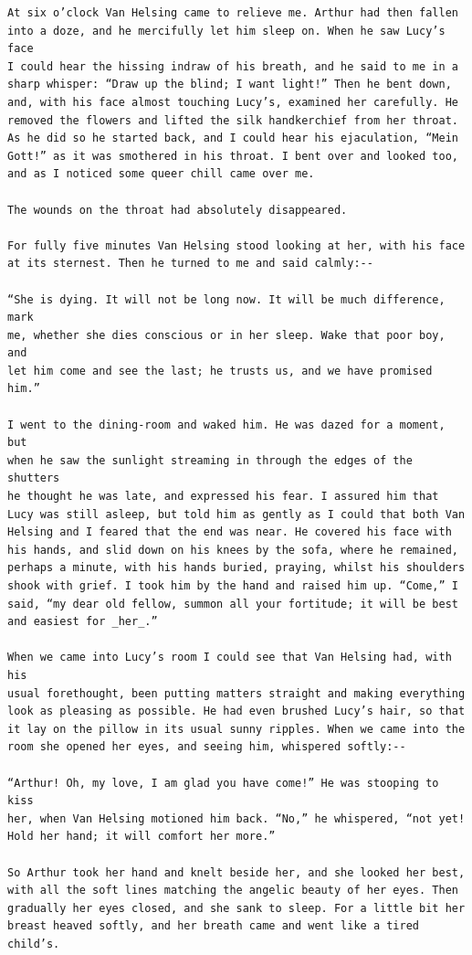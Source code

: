 \documentclass{article}
\begin{document}
\begin{verbatim}
At six o’clock Van Helsing came to relieve me. Arthur had then fallen
into a doze, and he mercifully let him sleep on. When he saw Lucy’s face
I could hear the hissing indraw of his breath, and he said to me in a
sharp whisper: “Draw up the blind; I want light!” Then he bent down,
and, with his face almost touching Lucy’s, examined her carefully. He
removed the flowers and lifted the silk handkerchief from her throat.
As he did so he started back, and I could hear his ejaculation, “Mein
Gott!” as it was smothered in his throat. I bent over and looked too,
and as I noticed some queer chill came over me.

The wounds on the throat had absolutely disappeared.

For fully five minutes Van Helsing stood looking at her, with his face
at its sternest. Then he turned to me and said calmly:--

“She is dying. It will not be long now. It will be much difference, mark
me, whether she dies conscious or in her sleep. Wake that poor boy, and
let him come and see the last; he trusts us, and we have promised him.”

I went to the dining-room and waked him. He was dazed for a moment, but
when he saw the sunlight streaming in through the edges of the shutters
he thought he was late, and expressed his fear. I assured him that
Lucy was still asleep, but told him as gently as I could that both Van
Helsing and I feared that the end was near. He covered his face with
his hands, and slid down on his knees by the sofa, where he remained,
perhaps a minute, with his hands buried, praying, whilst his shoulders
shook with grief. I took him by the hand and raised him up. “Come,” I
said, “my dear old fellow, summon all your fortitude; it will be best
and easiest for _her_.”

When we came into Lucy’s room I could see that Van Helsing had, with his
usual forethought, been putting matters straight and making everything
look as pleasing as possible. He had even brushed Lucy’s hair, so that
it lay on the pillow in its usual sunny ripples. When we came into the
room she opened her eyes, and seeing him, whispered softly:--

“Arthur! Oh, my love, I am glad you have come!” He was stooping to kiss
her, when Van Helsing motioned him back. “No,” he whispered, “not yet!
Hold her hand; it will comfort her more.”

So Arthur took her hand and knelt beside her, and she looked her best,
with all the soft lines matching the angelic beauty of her eyes. Then
gradually her eyes closed, and she sank to sleep. For a little bit her
breast heaved softly, and her breath came and went like a tired child’s.


\end{verbatim}
\end{document}
